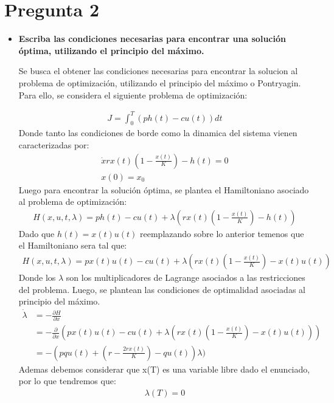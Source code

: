 \section{Pregunta 2}
\begin{itemize}
	\item \textbf{Escriba las condiciones necesarias para encontrar una solución óptima, utilizando el principio del máximo.}

Se busca el obtener las condiciones necesarias para encontrar la solucion al problema de optimización, utilizando el principio del máximo o Pontryagin. Para ello, se considera el siguiente problema de optimización:

\begin{align}
	 J = \int_{0}^{T} (ph(t) - cu(t))dt
\end{align}
Donde tanto las condiciones de borde como la dinamica del sistema vienen caracterizadas por:
\begin{align}
	\dot{x}  rx(t) \left(1 - \frac{x(t)}{K}\right) - h(t) = 0\\
	x(0) = x_0
\end{align}
Luego para encontrar la solución óptima, se plantea el Hamiltoniano asociado al problema de optimización:
\begin{align}
	H(x,u,t,\lambda) = ph(t) - cu(t) + \lambda \left( rx(t) \left(1 - \frac{x(t)}{K}\right) - h(t) \right)
\end{align}
Dado que $h(t)=x(t)u(t)$ reemplazando sobre lo anterior temenos que el Hamiltoniano sera tal que:
\begin{align}
	H(x,u,t,\lambda) = px(t)u(t) - cu(t) + \lambda \left( rx(t) \left(1 - \frac{x(t)}{K}\right) - x(t)u(t) \right)
\end{align}
Donde los $\lambda$ son los multiplicadores de Lagrange asociados a las restricciones del problema. Luego, se plantean las condiciones de optimalidad asociadas al principio del máximo.
\begin{align}
	\dot{\lambda}&= -\frac{\partial H}{\partial x}\\ 
	             &= -\frac{\partial}{\partial x} \left( px(t)u(t) - cu(t) + \lambda \left( rx(t) \left(1 - \frac{x(t)}{K}\right) - x(t)u(t) \right) \right)\\
				 &= -(pqu(t) + \left(r - \frac{2rx(t)}{K}\right)-qu(t))\lambda) 
\end{align}
Ademas debemos considerar que x(T) es una variable libre dado el enunciado, por lo que tendremos que:
\begin{align}
	\lambda(T) = 0 

\end{align}
\end{itemize}
